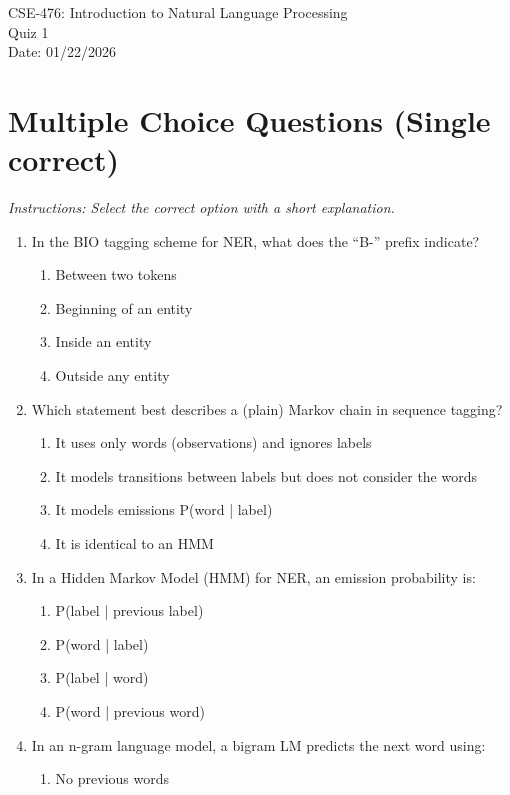 \documentclass[12pt]{article}
\begin{document}
\begin{center}
CSE-476: Introduction to Natural Language Processing \\
Quiz 1 \\
Date: 01/22/2026 \\
\end{center}

\section*{Multiple Choice Questions (Single correct)}
\textit{Instructions: Select the correct option with a short explanation.}
\begin{enumerate}[label=Q\arabic*.]
\item In the BIO tagging scheme for NER, what does the ``B-'' prefix indicate?
\begin{enumerate}[label=(\Alph*)]
    \item Between two tokens
    \item Beginning of an entity
    \item Inside an entity
    \item Outside any entity
\end{enumerate}
\item Which statement best describes a (plain) Markov chain in sequence tagging?
\begin{enumerate}[label=(\Alph*)]
    \item It uses only words (observations) and ignores labels
    \item It models transitions between labels but does not consider the words
    \item It models emissions P(word | label)
    \item It is identical to an HMM
\end{enumerate}
\item In a Hidden Markov Model (HMM) for NER, an emission probability is:
\begin{enumerate}[label=(\Alph*)]
    \item P(label | previous label)
    \item P(word | label)
    \item P(label | word)
    \item P(word | previous word)
\end{enumerate}
\item In an n-gram language model, a bigram LM predicts the next word using:
\begin{enumerate}[label=(\Alph*)]
    \item No previous words

\end{enumerate}
\end{enumerate}
\end{document}
